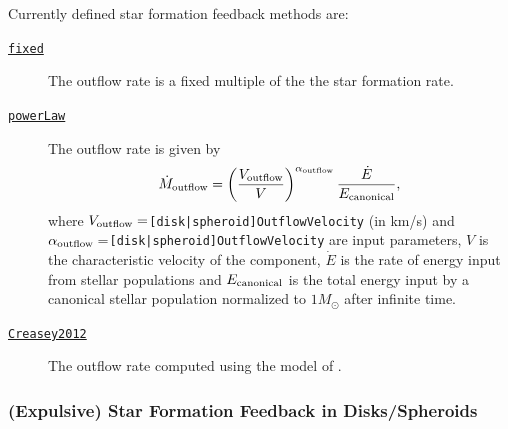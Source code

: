 Currently defined star formation feedback methods are:
\begin{description}
 \item [\hyperlink{star_formation.feedback.disks.fixed.F90:star_formation_feedback_disks_fixed}{{\tt fixed}}] The outflow rate is a fixed multiple of the the star formation rate.
 \item [\hyperlink{star_formation.feedback.spheroids.power_law.F90:star_formation_feedback_spheroids_power_law:star_formation_feedback_spheroid_outflow_rate_power_law}{{\tt powerLaw}}] The outflow rate is given by
\begin{equation}
 \dot{M}_{\rm outflow} = \left({V_{\rm outflow} \over V}\right)^{\alpha_{\rm outflow}} {\dot{E} \over E_{\rm canonical}},
\end{equation}
where $V_{\rm outflow}=${\tt [disk|spheroid]OutflowVelocity} (in km/s) and $\alpha_{\rm outflow}=${\tt [disk|spheroid]OutflowVelocity} are input parameters, $V$ is the characteristic velocity of the component, $\dot{E}$ is the rate of energy input from stellar populations and $E_{\rm canonical}$ is the total energy input by a canonical stellar population normalized to $1 M_\odot$ after infinite time.
 \item [\hyperlink{star_formation.feedback.disks.Creasy2012.F90:star_formation_feedback_disks_creasy2012}{{\tt Creasey2012}}] The outflow rate computed using the model of \cite{creasey_how_2012}.
\end{description}

\subsubsection{(Expulsive) Star Formation Feedback in Disks/Spheroids}

